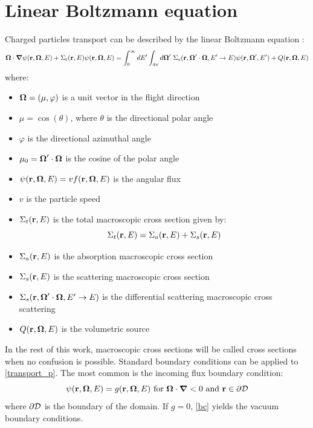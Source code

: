 \section{Linear Boltzmann equation}
Charged particles transport can be described by the linear Boltzmann equation 
\cite{morel_81,galerkin_morel,cepxs}:
\begin{equation}
\bo\cdot \bn \psi(\br,\bo,E) + \Sigma_t(\br,E)\psi(\br,\bo,E) =
\int_0^{\infty}dE'\int_{4\pi}d\bo'\ 
\Sigma_s(\br,\bo'\cdot\bo,E'\rightarrow E)\psi(\br,\bo',E')+Q(\br,\bo,E)
\label{transport_p}
\end{equation}
where:
\begin{itemize}
\item $\boldsymbol{\Omega} = (\mu,\varphi)$ is a unit vector in the flight direction
\item $\mu = \cos(\theta)$, where $\theta$ is the directional polar angle
\item $\varphi$ is the directional azimuthal angle
\item $\mu_0 = \boldsymbol{\Omega}'\cdot \boldsymbol{\Omega}$ is the cosine of the polar angle
\item $\psi(\mathbf{r},\boldsymbol{\Omega},E) = vf(\mathbf{r},\boldsymbol{\Omega},E)$ is the angular flux
\item $v$ is the particle speed
\item $\Sigma_t(\mathbf{r},E)$ is the total macroscopic cross section given by:
\begin{equation}
\Sigma_t(\mathbf{r},E) = \Sigma_a(\mathbf{r},E)+\Sigma_s(\mathbf{r},E)
\end{equation}
\item $\Sigma_a(\mathbf{r},E)$ is the absorption macroscopic cross section
\item $\Sigma_s(\mathbf{r},E)$ is the scattering macroscopic cross section
\item $\Sigma_s(\mathbf{r},\boldsymbol{\Omega}'\cdot \boldsymbol{\Omega}, E'\rightarrow E)$ is the differential
scattering macroscopic cross scattering
\item $Q(\mathbf{r},\boldsymbol{\Omega},E)$ is the volumetric source
\end{itemize}
In the rest of this work, macroscopic cross sections will be called cross
sections when no confusion is possible. Standard boundary conditions can be
applied to \cref{transport_p}. The most common is the incoming flux boundary
condition:
\begin{equation}
\psi (\br,\bo,E) = g(\br,\bo,E) \textrm{ for }\bo \cdot \bn <0 \textrm{ and }
\br \in \partial \mc{D}
\label{bc}
\end{equation}
where $\partial \mathcal{D}$ is the boundary of the domain. If $g=0$, \cref{bc} yields 
the vacuum boundary conditions.

